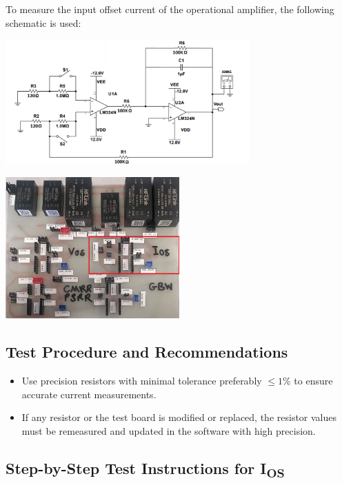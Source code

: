 \documentclass[a4paper,12pt]{article}
\begin{document}
To measure the input offset current of the operational amplifier, the following schematic is used:

\begin{center}
  \includegraphics[width=0.7\textwidth]{IMAGEs/ios_test_circuit.png}
\end{center}

\begin{center}
  \includegraphics[width=0.5\textwidth]{IMAGEs/ios_test_device.png}
\end{center}

\subsection*{Test Procedure and Recommendations}

\begin{itemize}
  \item Use precision resistors with minimal tolerance preferably \(\leq 1\%\) to ensure accurate current measurements.
  \item If any resistor or the test board is modified or replaced, the resistor values must be remeasured and updated in the software with high precision.
\end{itemize}

\subsection*{Step-by-Step Test Instructions for I\textsubscript{OS}}
\end{document}
